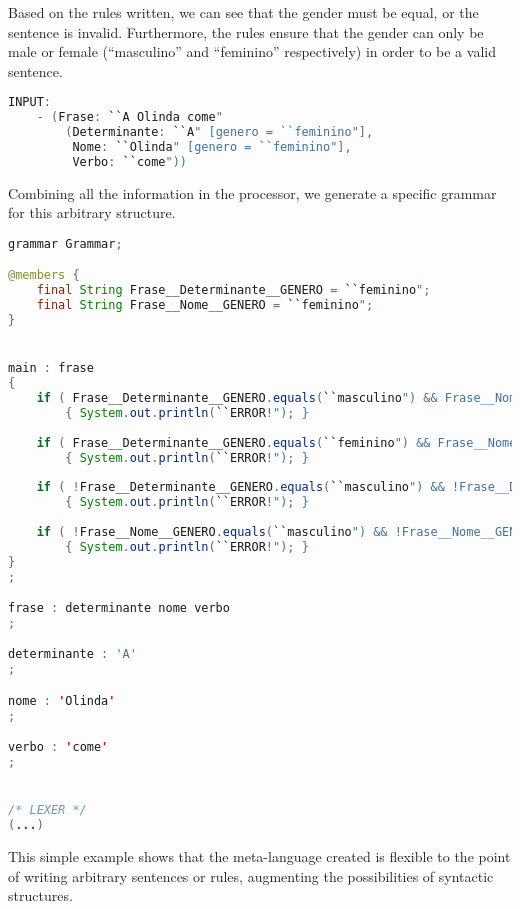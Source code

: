 Based on the rules written, we can see that the gender must be equal, or the sentence is invalid. Furthermore, the rules ensure that the gender can only be male or female (``masculino'' and ``feminino'' respectively) in order
to be a valid sentence.

\begin{center}
\begin{minipage}{14cm}
\begin{lstlisting}[language=java, basicstyle=\tiny, label={lst:arbitrary_structure_input}, caption=Example of an arbitrary sentence input]
INPUT:
    - (Frase: ``A Olinda come"
        (Determinante: ``A" [genero = ``feminino"],
         Nome: ``Olinda" [genero = ``feminino"],
         Verbo: ``come"))
\end{lstlisting}
\end{minipage}
\end{center}

Combining all the information in the processor, we generate a specific grammar for this arbitrary structure.

\begin{center}
\begin{minipage}{15cm}
\begin{lstlisting}[language=java, basicstyle=\tiny, label={lst:case_study_sentence}, caption=Example of a specific generated grammar.]
grammar Grammar;

@members {
    final String Frase__Determinante__GENERO = ``feminino";
    final String Frase__Nome__GENERO = ``feminino";
}


main : frase
{
    if ( Frase__Determinante__GENERO.equals(``masculino") && Frase__Nome__GENERO.equals(``feminino") ) 
        { System.out.println(``ERROR!"); }
	
    if ( Frase__Determinante__GENERO.equals(``feminino") && Frase__Nome__GENERO.equals(``masculino") ) 
        { System.out.println(``ERROR!"); }
	
    if ( !Frase__Determinante__GENERO.equals(``masculino") && !Frase__Determinante__GENERO.equals(``feminino") ) 
        { System.out.println(``ERROR!"); }
	
    if ( !Frase__Nome__GENERO.equals(``masculino") && !Frase__Nome__GENERO.equals(``feminino") ) 
        { System.out.println(``ERROR!"); }
}
;

frase : determinante nome verbo 
;

determinante : 'A'
;

nome : 'Olinda'
;

verbo : 'come'
;


/* LEXER */
(...)
\end{lstlisting}
\end{minipage}
\end{center}


This simple example shows that the meta-language created is flexible to the point of writing arbitrary sentences or rules, augmenting the possibilities of syntactic structures.
